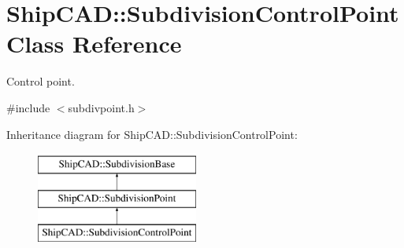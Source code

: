 \hypertarget{classShipCAD_1_1SubdivisionControlPoint}{\section{Ship\-C\-A\-D\-:\-:Subdivision\-Control\-Point Class Reference}
\label{classShipCAD_1_1SubdivisionControlPoint}
}


Control point.  




{\ttfamily \#include $<$subdivpoint.\-h$>$}

Inheritance diagram for Ship\-C\-A\-D\-:\-:Subdivision\-Control\-Point\-:\begin{figure}[H]
\begin{center}
\leavevmode
\includegraphics[height=3.000000cm]{classShipCAD_1_1SubdivisionControlPoint}
\end{center}
\end{figure}
